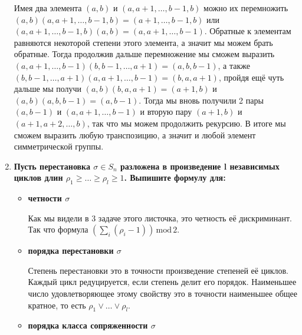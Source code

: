 \documentclass{article}
\begin{document}
\begin{enumerate}
        Имея два элемента $(a,b)$ и $(a,a+1,\ldots,b-1,b)$ можно их перемножить
        $(a,b)(a,a+1,\ldots,b-1,b)=(a+1,\ldots,b-1,b)$ или $(a,a+1,\ldots,b-1,b)
        (a,b)=(a,a+1,\ldots,b-1)$. Обратные к элементам равняются некоторой
        степени этого элемента, а значит мы можем брать обратные. Тогда продолжив
        дальше перемножение мы сможем выразить $(a,a+1,\ldots,b-1)(b,b-1,\ldots,a+1)
        =(a,b,b-1)$, а также $(b,b-1,\ldots,a+1)(a,a+1,\ldots,b-1)=(b,a,a+1)$,
        пройдя ещё чуть дальше мы получи $(a,b)(b,a,a+1)=(a+1,b)$ и $(a,b)(a,b,
        b-1)=(a,b-1)$. Тогда мы вновь получили 2 пары $(a,b-1)$ и $(a,a+1,
        \ldots,b-1)$ и вторую пару $(a+1,b)$ и $(a+1,a+2,\ldots,b)$, так что мы
        можем продолжить рекурсию. В итоге мы сможем выразить любую транспозицию,
        а значит и любой элемент симметрической группы.

    \item \textbf{Пусть перестановка $\sigma\in S_n$ разложена в произведение l
        независимых циклов длин $\rho_1\geq\ldots\geq\rho_l\geq 1$. Выпишите
        формулу для:}

        \begin{itemize}
            \item \textbf{четности $\sigma$}

                Как мы видели в 3 задаче этого листочка, это четность её
                дискриминант. Так что формула $(\sum_i(\rho_i-1))\,\text{mod}\,2$.

            \item \textbf{порядка перестановки $\sigma$}

                Степень перестановки это в точности произведение степеней
                её циклов. Каждый цикл редуцируется, если степень делит его
                порядок. Наименьшее число удовлетворяющее этому свойству это в
                точности наименьшее общее кратное, то есть $\rho_1\vee\ldots
                \vee\rho_l$.

            \item \textbf{порядка класса сопряженности $\sigma$}


\end{itemize}
\end{enumerate}
\end{document}
